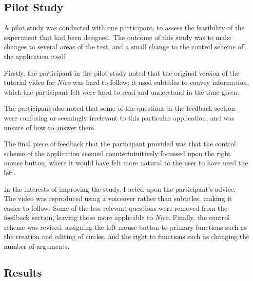 \documentclass[12pt,twoside,notitlepage,xetex]{report}
\begin{document}
\subsection{Pilot Study}

A pilot study was conducted with one participant, to assess the feasibility of the experiment that had been designed.  The outcome of this study was to make changes to several areas of the test, and a small change to the control scheme of the application itself.

Firstly, the participant in the pilot study noted that the original version of the tutorial video for \emph{Nico} was hard to follow; it used subtitles to convey information, which the participant felt were hard to read and understand in the time given.

The participant also noted that some of the questions in the feedback section were confusing or seemingly irrelevant to this particular application, and was unsure of how to answer them.

The final piece of feedback that the participant provided was that the control scheme of the application seemed counterintuitively focussed upon the right mouse button, where it would have felt more natural to the user to have used the left.

In the interests of improving the study, I acted upon the participant's advice. The video was reproduced using a voiceover rather than subtitles, making it easier to follow.  Some of the less relevant questions were removed from the feedback section, leaving those more applicable to \emph{Nico}.  Finally, the control scheme was revised, assigning the left mouse button to primary functions such as the creation and editing of circles, and the right to functions such as changing the number of arguments.

\subsection{Results}
\end{document}
